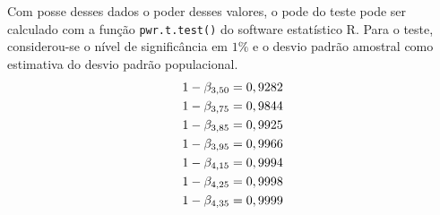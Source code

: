 	Com posse desses dados o poder desses valores, o pode do teste pode ser
	calculado com a função \texttt{pwr.t.test()} do software estatístico R.	Para o
	teste, considerou-se o nível de significância em $1\%$ e o desvio padrão
	amostral como estimativa do desvio padrão populacional.
	\begin{align*}
		1 - \beta_{3,50} &= 0,9282\\
		1 - \beta_{3,75} &= 0,9844\\
		1 - \beta_{3,85} &= 0,9925\\
		1 - \beta_{3,95} &= 0,9966\\
		1 - \beta_{4,15} &= 0,9994\\
		1 - \beta_{4,25} &= 0,9998\\
		1 - \beta_{4,35} &= 0,9999\\
	\end{align*}
